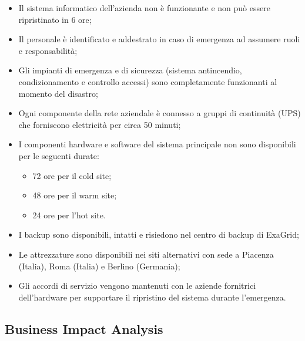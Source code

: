 \documentclass[12pt, a4paper, titlepage]{report}
\newcommand{\backupVendor}{ExaGrid} %
\begin{document}
		\begin{itemize}
			\item Il sistema informatico dell'azienda non è funzionante e non può essere ripristinato in 6 ore;
			\item Il personale è identificato e addestrato in caso di emergenza ad assumere ruoli e responsabilità;
			\item Gli impianti di emergenza e di sicurezza (sistema antincendio, condizionamento e controllo accessi) sono completamente funzionanti al momento del disastro;
			\item Ogni componente della rete aziendale è connesso a gruppi di continuità (UPS) che forniscono elettricità per circa 50 minuti;
			\item I componenti hardware e software del sistema principale non sono disponibili per le seguenti durate:
			\begin{itemize}
				\item 72 ore per il cold site;
				\item 48 ore per il warm site;
				\item 24 ore per l'hot site.
			\end{itemize}
			\item I backup sono disponibili, intatti e risiedono nel centro di backup di \backupVendor;
			\item Le attrezzature sono disponibili nei siti alternativi con sede a Piacenza (Italia), Roma (Italia) e Berlino (Germania);
			\item Gli accordi di servizio vengono mantenuti con le aziende fornitrici dell'hardware per supportare il ripristino del sistema durante l'emergenza.
		\end{itemize}		
	
	
		\subsection{Business Impact Analysis} \label{bia}
		
\end{document}
